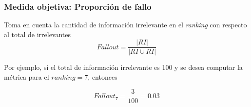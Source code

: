 \documentclass[
10pt, %
aspectratio=169, %
]{beamer}
\begin{document}
\begin{frame}
\begin{minipage}{.6\textwidth}
		\end{minipage}%
		
	\end{frame}
	
	\begin{frame}
		
		\frametitle{Medida objetiva: Proporción de fallo}
		
		\begin{minipage}{.5\textwidth}
			
			Toma en cuenta la cantidad de información irrelevante en el \emph{ranking} con respecto al total de irrelevantes
			$$Fallout = \frac{|RI|}{|RI \cup RI|}$$
			
			\vspace{3\baselineskip}
			
			Por ejemplo, si el total de información irrelevante es 100 y se desea computar la métrica para el $ranking = 7$, entonces
			
			$$Fallout_7 = \frac{3}{100} = 0.03$$
			
		\end{minipage}%
		\begin{minipage}{.6\textwidth}
			
			\begin{table}[ht]
				

\end{table}
\end{minipage}
\end{frame}
\end{document}

